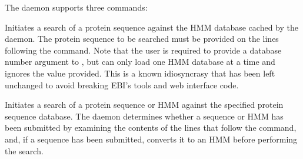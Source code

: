 \documentclass[notoc,justified]{tufte-book}    %
\begin{document}
{The daemon supports three commands:

\begin{sreitems}{}
  \item[\monob{@-{}-hmmdb <database \#>}]  Initiates a search of a protein sequence against the HMM database cached by the daemon.  The protein sequence to be searched must be provided on the lines following the  command.  Note that the user is required to provide a database number argument to , but  can only load one HMM database at a time and ignores the value provided.  This is a known idiosyncrasy that has been left unchanged to avoid breaking EBI's tools and web interface code.
  \item[\monob{@-{}-seqdb <database \#> [-{}-seqdb\_ranges <rangelist>]}] Initiates a search of a protein sequence or HMM against the specified protein sequence database.  The daemon determines whether a sequence or HMM has been submitted by examining the contents of the lines that follow the command, and, if a sequence has been submitted, converts it to an HMM before performing the search.


\end{sreitems}}
\end{document}

